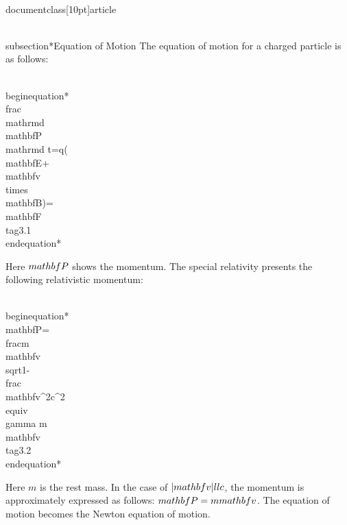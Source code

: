 \\documentclass[10pt]{article}
\begin{document}
\\subsection*{Equation of Motion}
The equation of motion for a charged particle is as follows:


\\begin{equation*}
\\frac{\\mathrm{d} \\mathbf{P}}{\\mathrm{d} t}=q(\\mathbf{E}+\\mathbf{v} \\times \\mathbf{B})=\\mathbf{F} \\tag{3.1}
\\end{equation*}


Here $\\mathbf{P}$ shows the momentum. The special relativity presents the following relativistic momentum:


\\begin{equation*}
\\mathbf{P}=\\frac{m \\mathbf{v}}{\\sqrt{1-\\frac{\\mathbf{v}^{2}}{c^{2}}}} \\equiv \\gamma m \\mathbf{v} \\tag{3.2}
\\end{equation*}


Here $m$ is the rest mass. In the case of $|\\mathbf{v}| \\ll c$, the momentum is approximately expressed as follows: $\\mathbf{P}=m \\mathbf{v}$. The equation of motion becomes the Newton equation of motion.
\end{document}
